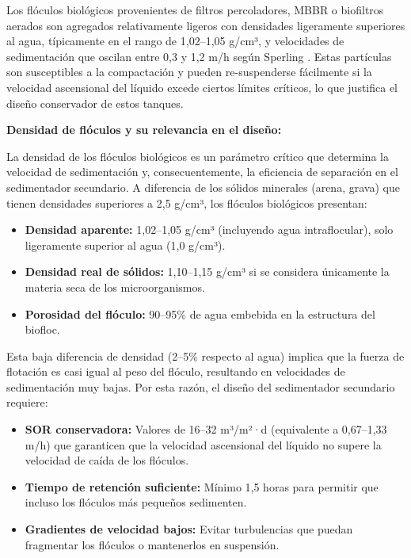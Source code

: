 \documentclass[12pt,a4paper]{article}
\begin{document}
Los flóculos biológicos provenientes de filtros percoladores, MBBR o biofiltros aerados son agregados relativamente ligeros con densidades ligeramente superiores al agua, típicamente en el rango de 1,02--1,05 g/cm³, y velocidades de sedimentación que oscilan entre 0,3 y 1,2 m/h según Sperling \cite{sperling2007}. Estas partículas son susceptibles a la compactación y pueden re-suspenderse fácilmente si la velocidad ascensional del líquido excede ciertos límites críticos, lo que justifica el diseño conservador de estos tanques.

\textbf{Densidad de flóculos y su relevancia en el diseño:}

La densidad de los flóculos biológicos es un parámetro crítico que determina la velocidad de sedimentación y, consecuentemente, la eficiencia de separación en el sedimentador secundario. A diferencia de los sólidos minerales (arena, grava) que tienen densidades superiores a 2,5 g/cm³, los flóculos biológicos presentan:

\begin{itemize}[noitemsep,leftmargin=2em]
    \item \textbf{Densidad aparente:} 1,02--1,05 g/cm³ (incluyendo agua intraflocular), solo ligeramente superior al agua (1,0 g/cm³).
    \item \textbf{Densidad real de sólidos:} 1,10--1,15 g/cm³ si se considera únicamente la materia seca de los microorganismos.
    \item \textbf{Porosidad del flóculo:} 90--95\% de agua embebida en la estructura del biofloc.
\end{itemize}

Esta baja diferencia de densidad (2--5\% respecto al agua) implica que la fuerza de flotación es casi igual al peso del flóculo, resultando en velocidades de sedimentación muy bajas. Por esta razón, el diseño del sedimentador secundario requiere:

\begin{itemize}[noitemsep,leftmargin=2em]
    \item \textbf{SOR conservadora:} Valores de 16--32 m³/m²·d (equivalente a 0,67--1,33 m/h) que garanticen que la velocidad ascensional del líquido no supere la velocidad de caída de los flóculos.
    \item \textbf{Tiempo de retención suficiente:} Mínimo 1,5 horas para permitir que incluso los flóculos más pequeños sedimenten.
    \item \textbf{Gradientes de velocidad bajos:} Evitar turbulencias que puedan fragmentar los flóculos o mantenerlos en suspensión.
\end{itemize}
\end{document}
